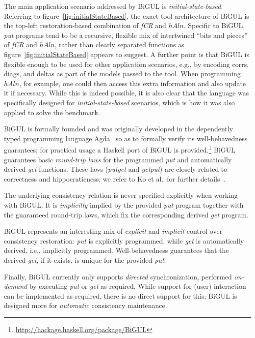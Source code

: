 The main application scenario addressed by BiGUL is \emph{initial-state-based}.
Referring to figure~\ref{fig:initialStateBased}, the exact tool architecture of BiGUL is the top-left restoration-based combination of \emph{fCR} and $\mathit{hAln}$.
Specific to BiGUL, \emph{put} programs tend to be a recursive, flexible mix of intertwined ``bits and pieces'' of \emph{fCR} and $\mathit{hAln}$, rather than clearly separated functions as figure~\ref{fig:initialStateBased} appears to suggest.
A further point is that BiGUL is flexible enough to be used for other application scenarios, e.g., by encoding corrs, diags, and deltas as part of the models passed to the tool.
When programming $\mathit{hAln}$, for example, one could then access this extra information and also update it if necessary.
While this is indeed possible, it is also clear that the language was specifically designed for \emph{initial-state-based} scenarios, which is how it was also applied to solve the benchmark.

BiGUL is formally founded and was originally developed in the dependently typed programming language Agda~\cite{AFP08-Norell} so as to formally verify its well-behavedness guarantees; for practical usage a Haskell port of BiGUL is provided.\footnote{\url{http://hackage.haskell.org/package/BiGUL}}
BiGUL guarantees basic \emph{round-trip laws} for the programmed \emph{put} and automatically derived \emph{get} functions.
These laws (\emph{putget} and \emph{getput}) are closely related to correctness and hippocraticness; we refer to Ko et al.~for further details~\cite{PEPM2016-Ko}.

The underlying consistency relation is never specified explicitly when working with BiGUL.
It is \emph{implicitly} implied by the provided \emph{put} program together with the guaranteed round-trip laws, which fix the corresponding derived \emph{get} program.

BiGUL represents an interesting mix of \emph{explicit} and \emph{implicit} control over consistency restoration:  \emph{put} is explicitly programmed, while \emph{get} is automatically derived, i.e., implicitly programmed.
Well-behavedness guarantees that the derived \emph{get}, if it exists, is unique for the provided \emph{put}.

Finally, BiGUL currently only supports \emph{directed} synchronization, performed \emph{on-demand} by executing \emph{put} or \emph{get} as required.
While support for (user) interaction can be implemented as required, there is no direct support for this; BiGUL is designed more for \emph{automatic} consistency maintenance. 


